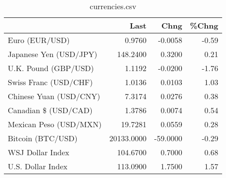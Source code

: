 \documentclass{article}%
\begin{document}
%


\begin{table}[htbp]%
\caption{currencies.csv}%
\centering%
\begin{adjustbox}{width=1\textwidth}%
\begin{tabular}{lrrr}
\toprule
                       &       Last &     Chng &  \%Chng \\
\midrule
        Euro (EUR/USD) &     0.9760 &  -0.0058 &  -0.59 \\
Japanese Yen (USD/JPY) &   148.2400 &   0.3200 &   0.21 \\
  U.K. Pound (GBP/USD) &     1.1192 &  -0.0200 &  -1.76 \\
 Swiss Franc (USD/CHF) &     1.0136 &   0.0103 &   1.03 \\
Chinese Yuan (USD/CNY) &     7.3174 &   0.0276 &   0.38 \\
  Canadian \$ (USD/CAD) &     1.3786 &   0.0074 &   0.54 \\
Mexican Peso (USD/MXN) &    19.7281 &   0.0559 &   0.28 \\
     Bitcoin (BTC/USD) & 20133.0000 & -59.0000 &  -0.29 \\
      WSJ Dollar Index &   104.6700 &   0.7000 &   0.68 \\
     U.S. Dollar Index &   113.0900 &   1.7500 &   1.57 \\
\bottomrule
\end{tabular}
%
\end{adjustbox}%
\end{table}

%
\end{document}
